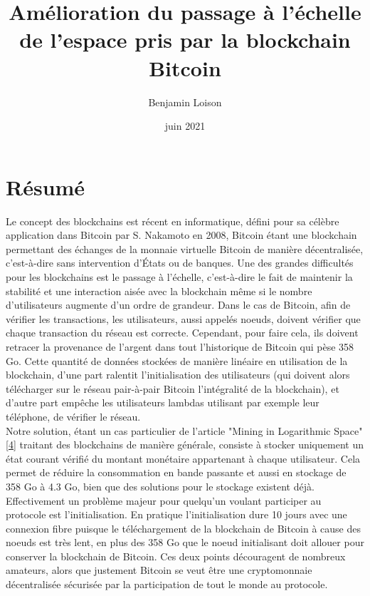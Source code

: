 \documentclass[12pt,a4paper]{article}
\newcommand{\source}[1]{\hyperlink{#1}{[#1]}}
\begin{document}
	\title{Amélioration du passage à l'échelle de l'espace pris par la blockchain Bitcoin} %
	\author{Benjamin Loison}
	\date{juin 2021}
	\maketitle

	
	\section{Résumé}
	
	Le concept des blockchains est récent en informatique, défini pour sa célèbre application dans Bitcoin par S. Nakamoto en 2008, Bitcoin étant une blockchain permettant des échanges de la monnaie virtuelle Bitcoin de manière décentralisée, c'est-à-dire sans intervention d'États ou de banques. Une des grandes difficultés pour les blockchains est le passage à l'échelle, c'est-à-dire le fait de maintenir la stabilité et une interaction aisée avec la blockchain même si le nombre d'utilisateurs augmente d'un ordre de grandeur. Dans le cas de Bitcoin, afin de vérifier les transactions, les utilisateurs, aussi appelés noeuds, doivent vérifier que chaque transaction du réseau est correcte. Cependant, pour faire cela, ils doivent retracer la provenance de l'argent dans tout l'historique de Bitcoin qui pèse 358 Go. Cette quantité de données stockées de manière linéaire en utilisation de la blockchain, d'une part ralentit l'initialisation des utilisateurs (qui doivent alors télécharger sur le réseau pair-à-pair Bitcoin l'intégralité de la blockchain), et d'autre part empêche les utilisateurs lambdas utilisant par exemple leur téléphone, de vérifier le réseau.\\
  Notre solution, étant un cas particulier de l'article "Mining in Logarithmic Space" \source{4} traitant des blockchains de manière générale, consiste à stocker uniquement un état courant vérifié du montant monétaire appartenant à chaque utilisateur. Cela permet de réduire la consommation en bande passante et aussi en stockage de 358 Go à 4.3 Go, bien que des solutions pour le stockage existent déjà. Effectivement un problème majeur pour quelqu'un voulant participer au protocole est l'initialisation. En pratique l'initialisation dure 10 jours avec une connexion fibre puisque le téléchargement de la blockchain de Bitcoin à cause des noeuds est très lent, en plus des 358 Go que le noeud initialisant doit allouer pour conserver la blockchain de Bitcoin. Ces deux points découragent de nombreux amateurs, alors que justement Bitcoin se veut être une cryptomonnaie décentralisée sécurisée par la participation de tout le monde au protocole.\\
\end{document}
